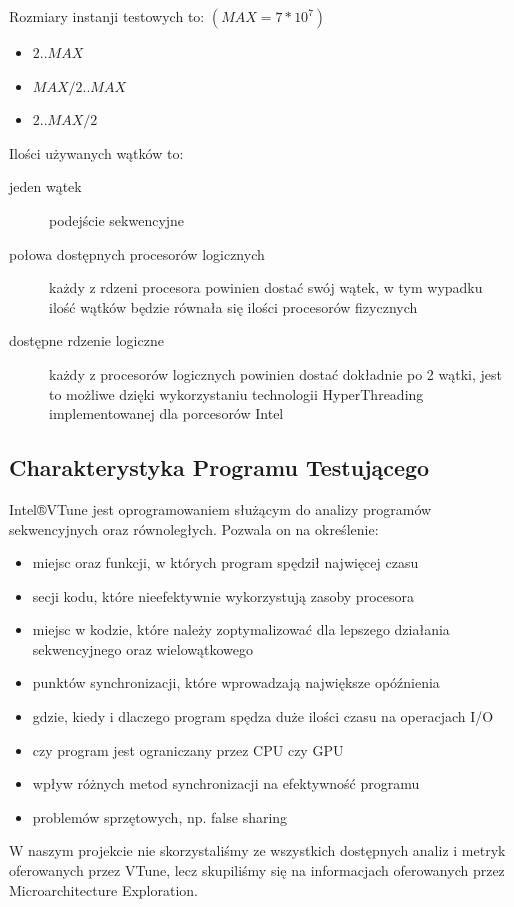 \documentclass{article}
\begin{document}
                \noindent
                Rozmiary instanji testowych to: $(MAX = 7 * 10^7)$
                \begin{itemize}
                    \item $2 .. MAX$
                    \item $MAX / 2 .. MAX$
                    \item $2 .. MAX / 2$
                \end{itemize}
                
                \noindent
                Ilości używanych wątków to:
                \begin{description}
                    \item[jeden wątek] podejście sekwencyjne
                    \item[połowa dostępnych procesorów logicznych] każdy z rdzeni procesora powinien dostać swój wątek, w tym wypadku ilość wątków będzie równała się ilości procesorów fizycznych
                    \item[dostępne rdzenie logiczne] każdy z procesorów logicznych powinien dostać dokładnie po 2 wątki, jest to możliwe dzięki wykorzystaniu technologii HyperThreading implementowanej dla porcesorów Intel
                \end{description}
        
        \subsection{Charakterystyka Programu Testującego}
            Intel®VTune jest oprogramowaniem służącym do analizy programów sekwencyjnych oraz równoległych. Pozwala on na określenie:
            \begin{itemize}
                \item miejsc oraz funkcji, w których program spędził najwięcej czasu
                \item secji kodu, które nieefektywnie wykorzystują zasoby procesora
                \item miejsc w kodzie, które należy zoptymalizować dla lepszego działania sekwencyjnego oraz wielowątkowego
                \item punktów synchronizacji, które wprowadzają największe opóźnienia
                \item gdzie, kiedy i dlaczego program spędza duże ilości czasu na operacjach I/O
                \item czy program jest ograniczany przez CPU czy GPU
                \item wpływ różnych metod synchronizacji na efektywność programu
                \item problemów sprzętowych, np. false sharing
            \end{itemize}
            W naszym projekcie nie skorzystaliśmy ze wszystkich dostępnych analiz i metryk oferowanych przez VTune, lecz skupiliśmy się na informacjach oferowanych przez Microarchitecture Exploration.
        
\end{document}
